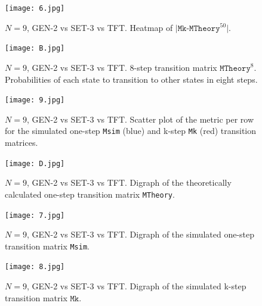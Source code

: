 \documentclass[12pt]{report}
\begin{document}
\begin{figure}[h!]
    \centering
    \texttt{[image: 6.jpg]}
    \caption{$N=9$, GEN-2 vs SET-3 vs TFT. Heatmap of $|\texttt{Mk}$-$\texttt{MTheory}^{50}|$.}
    \label{6}
\end{figure}

\begin{figure}[h!]
    \centering
    \texttt{[image: B.jpg]}
    \caption{$N=9$, GEN-2 vs SET-3 vs TFT. 8-step transition matrix $\texttt{MTheory}^8$. Probabilities of each state to transition to other states in eight steps.}
    \label{B}
\end{figure}

\begin{figure}
    \centering
    \texttt{[image: 9.jpg]}
    \caption{$N=9$, GEN-2 vs SET-3 vs TFT. Scatter plot of the metric per row for the simulated one-step \texttt{Msim} (blue) and k-step \texttt{Mk} (red) transition matrices.}
    \label{9}
\end{figure}

\begin{figure}
    \centering
    \texttt{[image: D.jpg]}
    \caption{$N=9$, GEN-2 vs SET-3 vs TFT. Digraph of the theoretically calculated one-step transition matrix \texttt{MTheory}.}
    \label{D}
\end{figure}

\begin{figure}
    \centering
    \texttt{[image: 7.jpg]}
    \caption{$N=9$, GEN-2 vs SET-3 vs TFT. Digraph of the simulated one-step transition matrix \texttt{Msim}.}
    \label{7}
\end{figure}

\begin{figure}
    \centering
    \texttt{[image: 8.jpg]}
    \caption{$N=9$, GEN-2 vs SET-3 vs TFT. Digraph of the simulated k-step transition matrix $\texttt{Mk}$.}
    \label{8}
\end{figure}
\end{document}
